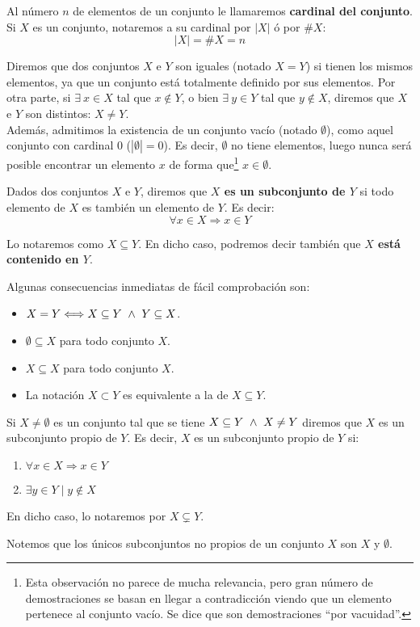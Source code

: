 \begin{definicion}[Cardinal]
    Al número $n$ de elementos de un conjunto le llamaremos \textbf{cardinal del conjunto}. Si $X$
    es un conjunto, notaremos a su cardinal por $|X|$ ó por $\#X$:
    $$|X| = \#X = n$$
\end{definicion}

Diremos que dos conjuntos $X$ e $Y$ son iguales (notado $X = Y$) si tienen los mismos elementos, ya que un conjunto está totalmente definido por sus elementos. Por otra parte, si $\exists \ x \in X$ tal que $x \notin Y$, o bien $\exists \ y \in Y$ tal que $y \notin X$, diremos que $X$ e $Y$ son distintos: $X \neq Y$.\\

Además, admitimos la existencia de un conjunto vacío (notado $\emptyset$), como aquel conjunto con cardinal 0 ($|\emptyset| = 0$). Es decir, $\emptyset$ no tiene elementos, luego nunca será posible encontrar un elemento $x$ de forma que\footnote{Esta observación no parece de mucha relevancia, pero gran número de demostraciones se basan en llegar a contradicción viendo que un elemento pertenece al conjunto vacío. Se dice que son demostraciones ``por vacuidad''.} $x\in \emptyset $.

\begin{definicion}[Subconjunto]
    Dados dos conjuntos $X$ e $Y$, diremos que \textbf{$X$ es un subconjunto de $Y$} si todo elemento de $X$ es también un elemento de $Y$. Es decir:
    $$\forall x \in X \Rightarrow x \in Y$$
    
    Lo notaremos como $X \subseteq Y$. En dicho caso, podremos decir también que \textbf{$X$ está contenido en $Y$}.
\end{definicion}

Algunas consecuencias inmediatas de fácil comprobación son:
\begin{itemize}
    \item $X = Y \Longleftrightarrow X \subseteq Y \ \land \  Y \subseteq X$.
    \item $\emptyset \subseteq X$ para todo conjunto $X$.
    \item $X \subseteq X$ para todo conjunto $X$.
    \item La notación $X \subset Y$ es equivalente a la de $X \subseteq Y$.
\end{itemize}

\begin{definicion}
    Si $X \neq \emptyset$ es un conjunto tal que se tiene $X \subseteq Y \ \land \  X \neq Y$ diremos que $X$ es un subconjunto propio de $Y$.
    Es decir, $X$ es un subconjunto propio de $Y$ si:
    \begin{enumerate}
        \item $\forall x \in X \Rightarrow x \in Y$
        \item $\exists y \in Y \mid y \notin X$
    \end{enumerate}
    
    En dicho caso, lo notaremos por $X \subsetneq Y$.
\end{definicion}
Notemos que los únicos subconjuntos no propios de un conjunto $X$ son $X$ y $\emptyset $.

